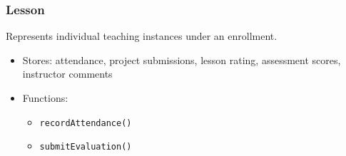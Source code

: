 \subsubsection{Lesson}
Represents individual teaching instances under an enrollment.
\begin{itemize}
    \item Stores: attendance, project submissions, lesson rating, assessment scores, instructor comments
    \item Functions:
    \begin{itemize}
        \item \texttt{recordAttendance()}
        \item \texttt{submitEvaluation()}
    \end{itemize}
\end{itemize}




